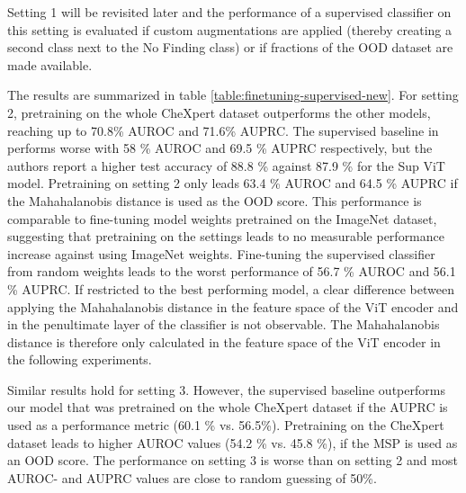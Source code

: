 Setting 1 will be revisited later and the performance of a supervised classifier on this setting is evaluated if custom augmentations are applied (thereby creating a second class next to the No Finding class) or if fractions of the OOD dataset are made available.
\par
The results are summarized in table \ref{table:finetuning-supervised-new}.
For setting 2, pretraining on the whole CheXpert dataset outperforms the other models, reaching up to 70.8\% AUROC and 71.6\% AUPRC.
The supervised baseline in \citep{Berger2021} performs worse with 58 \% AUROC and 69.5 \% AUPRC respectively, but the authors report a higher test accuracy of 88.8 \% against 87.9 \% for the Sup ViT model.
Pretraining on setting 2 only leads 63.4 \% AUROC and 64.5 \% AUPRC if the Mahahalanobis distance is used as the OOD score.
This performance is comparable to fine-tuning model weights pretrained on the ImageNet dataset, suggesting that pretraining on the settings leads to no measurable performance increase against using ImageNet weights.
Fine-tuning the supervised classifier from random weights leads to the worst performance of 56.7 \% AUROC and 56.1 \% AUPRC.
If restricted to the best performing model, a clear difference between applying the Mahahalanobis distance in the feature space of the ViT encoder and in the penultimate layer of the classifier is not observable.
The Mahahalanobis distance is therefore only calculated in the feature space of the ViT encoder in the following experiments.
\par
Similar results hold for setting 3. However, the supervised baseline outperforms our model that was pretrained on the whole CheXpert dataset if the AUPRC is used as a performance metric (60.1 \% vs. 56.5\%).
Pretraining on the CheXpert dataset leads to higher AUROC values (54.2 \% vs. 45.8 \%), if the MSP is used as an OOD score. 
The performance on setting 3 is worse than on setting 2 and most AUROC- and AUPRC values are close to random guessing of 50\%.

